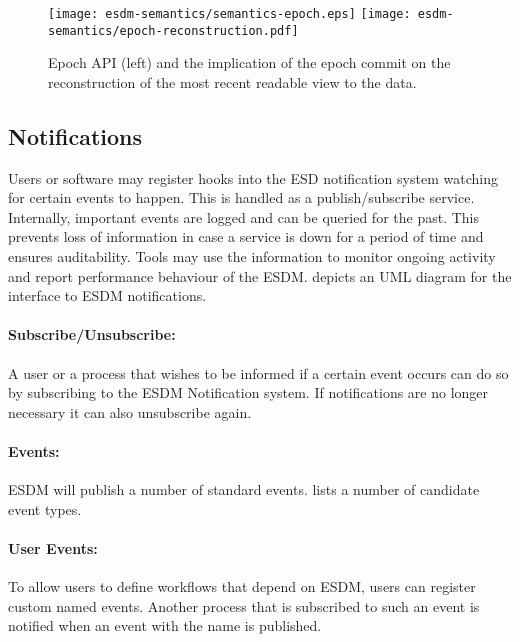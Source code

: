 \begin{figure}
	\centering
	\texttt{[image: esdm-semantics/semantics-epoch.eps]}
	\texttt{[image: esdm-semantics/epoch-reconstruction.pdf]}
	\caption{Epoch API (left) and the implication of the epoch commit on the reconstruction of the most recent readable view to the data.}
	\label{fig:epoch semantics}
\end{figure}






\subsection{Notifications}
\label{sec: viewpoints/logical/data model/notification}

Users or software may register hooks into the ESD notification system watching for certain events to happen.
This is handled as a publish/subscribe service.
Internally, important events are logged and can be queried for the past.
This prevents loss of information in case a service is down for a period of time and ensures auditability.
Tools may use the information to monitor ongoing activity and report performance behaviour of the ESDM.
 depicts an UML diagram for the interface to ESDM notifications.


\paragraph{Subscribe/Unsubscribe:}
A user or a process that wishes to be informed if a certain event occurs can do so by subscribing to the ESDM Notification system. If notifications are no longer necessary it can also unsubscribe again.

\paragraph{Events:}
ESDM will publish a number of standard events.  lists a number of candidate event types.

\paragraph{User Events:}
To allow users to define workflows that depend on ESDM, users can register custom named events. Another process that is subscribed to such an event is notified when an event with the name is published.


